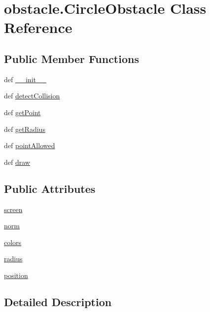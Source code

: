 \hypertarget{classobstacle_1_1CircleObstacle}{\section{obstacle.\-Circle\-Obstacle Class Reference}
\label{classobstacle_1_1CircleObstacle}
}
\subsection*{Public Member Functions}
\begin{DoxyCompactItemize}
\item 
def \hyperlink{classobstacle_1_1CircleObstacle_a575f0b53ef4d4432df5b35350253e205}{\-\_\-\-\_\-init\-\_\-\-\_\-}
\item 
def \hyperlink{classobstacle_1_1CircleObstacle_aeafba185ffd022111c7fefda32a0c60f}{detect\-Collision}
\item 
def \hyperlink{classobstacle_1_1CircleObstacle_a6a9e4f00f264acffb07b009886a8d373}{get\-Point}
\item 
def \hyperlink{classobstacle_1_1CircleObstacle_a43681b187fd3db8d3b9a597cecc1fbf1}{get\-Radius}
\item 
def \hyperlink{classobstacle_1_1CircleObstacle_a5263db0078609a270b0a60401c43f751}{point\-Allowed}
\item 
def \hyperlink{classobstacle_1_1CircleObstacle_a1393f6f9ca57bd932963975bbbeb47f2}{draw}
\end{DoxyCompactItemize}
\subsection*{Public Attributes}
\begin{DoxyCompactItemize}
\item 
\hyperlink{classobstacle_1_1CircleObstacle_a5930464c31645b5011c479addc56f0a1}{screen}
\item 
\hyperlink{classobstacle_1_1CircleObstacle_a8c25cc489dbd52223b94b2eb18a1b98e}{norm}
\item 
\hyperlink{classobstacle_1_1CircleObstacle_ac2419d9063b6c669e2bc0e3722f46e2c}{colors}
\item 
\hyperlink{classobstacle_1_1CircleObstacle_a7ebababb5aa806648ee2f70897fd9872}{radius}
\item 
\hyperlink{classobstacle_1_1CircleObstacle_aea2e66706ff3552617a8d3ad809baf84}{position}
\end{DoxyCompactItemize}


\subsection{Detailed Description}


